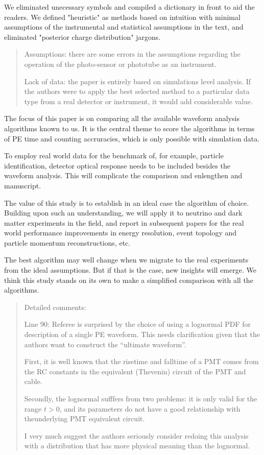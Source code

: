 \documentclass[12pt]{article}
\begin{document}
We eliminated unecessary symbols and compiled a dictionary in front to aid the readers.  We defined "heuristic" as methods based on intuition with minimal assumptions of the instrumental and statistical assumptions in the text, and eliminated "posterior charge distribution" jargons.

\begin{quote}
Assumptions: there are some errors in the assumptions regarding the operation of the photo-sensor or phototube as an instrument.

Lack of data: the paper is entirely based on simulations level analysis. If the authors were to apply the best selected method to a particular data type from a real detector or instrument, it would add considerable value.
\end{quote}

The focus of this paper is on comparing all the available waveform analysis algorithms known to us.  It is the central theme to score the algorithms in terms of PE time and counting accruracies, which is only possible with simulation data.

To employ real world data for the benchmark of, for example, particle identification, detector optical response needs to be included besides the waveform analysis.  This will complicate the comparison and enlengthen and manuscript.

The value of this study is to establish in an ideal case the algorithm of choice.  Building upon such an understanding, we will apply it to neutrino and dark matter experiments in the field, and report in subsequent papers for the real world performance improvements in energy resolution, event topology and particle momentum reconstructions, etc.

The best algorithm may well change when we migrate to the real experiments from the ideal assumptions.  But if that is the case, new insights will emerge.  We think this study stands on its own to make a simplified comparison with all the algorithms.

\begin{quote}

Detailed comments:

Line 90: Referee is surprised by the choice of using a lognormal PDF for description of a single PE waveform. This needs clarification given that the authors want to construct the ``ultimate waveform''.

First, it is well known that the risetime and falltime of a PMT comes from the RC constants in the equivalent (Thevenin) circuit of the PMT and cable. 

Secondly, the lognormal sufffers from two problems: it is only valid for the range $t>0$, and its parameters do not have a good relationship with theunderlying PMT equivalent circuit.

I very much suggest the authors seriously consider redoing this analysis with a distribution that has more physical meaning than the lognormal. 
\end{quote}
\end{document}
